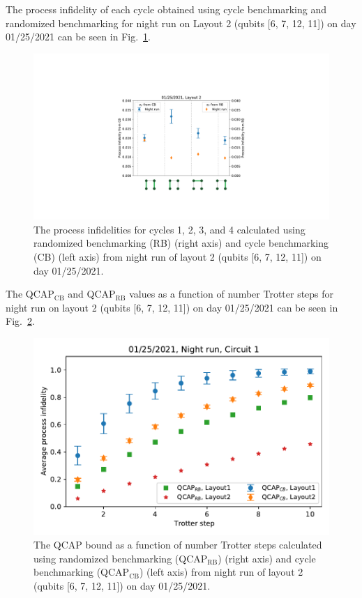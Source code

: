 The process infidelity of each cycle obtained using cycle benchmarking and randomized benchmarking for night run on Layout 2 (qubits [6, 7, 12, 11]) on day 01/25/2021 can be seen in Fig.~\ref{fig:processinfidelitiesStory5}.

\begin{figure}[htpb]
    \includegraphics[scale=0.5]{ProcessInfidelitiesCB_RB_plots_25_night_L2.pdf}
    \caption{The process infidelities for cycles  1, 2, 3, and 4 calculated using randomized benchmarking (RB) (right axis) and cycle benchmarking (CB) (left axis) from night run of layout 2 (qubits [6, 7, 12, 11]) on day 01/25/2021.}
    \label{fig:processinfidelitiesStory5}
\end{figure}

The QCAP$_{\text{CB}}$ and QCAP$_{\text{RB}}$ values as a function of number Trotter steps for night run on layout 2 (qubits [6, 7, 12, 11]) on day 01/25/2021 can be seen in Fig.~\ref{fig:QCAPCB_RB_Story5}.

\begin{figure}[htpb]
    \includegraphics[scale=0.56]{QCAP_CB_RB_Data_01_25_2021_Layout_1_2C1_Night.pdf}
    \caption{The QCAP bound as a function of number Trotter steps calculated using randomized benchmarking (QCAP$_{\text{RB}}$) (right axis) and cycle benchmarking (QCAP$_{\text{CB}}$) (left axis) from night run of layout 2 (qubits [6, 7, 12, 11]) on day 01/25/2021.}
    \label{fig:QCAPCB_RB_Story5}
\end{figure}

